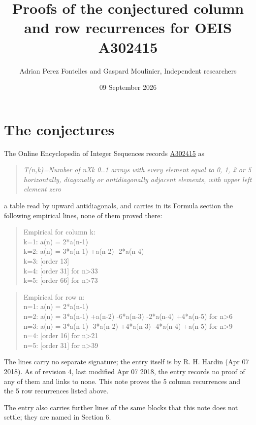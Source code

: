 \documentclass[11pt]{article}
\title{Proofs of the conjectured column and row recurrences for OEIS A302415}
\author{Adrian Perez Fontelles and Gaspard Moulinier, Independent researchers}
\date{09 September 2026}
\theoremstyle{definition}
\begin{document}
\maketitle
\section{The conjectures}

The Online Encyclopedia of Integer Sequences records \href{https://oeis.org/A302415}{A302415} as

\begin{quote}\itshape T(n,k)=Number of nXk 0..1 arrays with every element equal to 0, 1, 2 or 5 horizontally, diagonally or antidiagonally adjacent elements, with upper left element zero\end{quote}

a table read by upward antidiagonals, and carries in its Formula section the following empirical lines, none of them proved there:

\begin{quote}\ttfamily Empirical for column k:\\
k=1: a(n) = 2*a(n-1)\\k=2: a(n) = 3*a(n-1) +a(n-2) -2*a(n-4)\\k=3: [order 13]\\k=4: [order 31] for n>33\\k=5: [order 66] for n>73\end{quote}

\begin{quote}\ttfamily Empirical for row n:\\
n=1: a(n) = 2*a(n-1)\\n=2: a(n) = 3*a(n-1) +a(n-2) -6*a(n-3) -2*a(n-4) +4*a(n-5) for n>6\\n=3: a(n) = 3*a(n-1) -3*a(n-2) +4*a(n-3) -4*a(n-4) +a(n-5) for n>9\\n=4: [order 16] for n>21\\n=5: [order 31] for n>39\end{quote}

The lines carry no separate signature; the entry itself is by R. H. Hardin (Apr 07 2018). As of revision 4, last modified Apr 07 2018, the entry records no proof of any of them and links to none. This note proves the 5 column recurrences and the 5 row recurrences listed above.

The entry also carries further lines of the same blocks that this note does not settle; they are named in Section 6.
\end{document}
